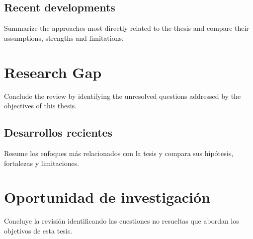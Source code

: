 {
  \subsection{Recent developments}

  Summarize the approaches most directly related to the thesis and compare their assumptions, strengths and limitations.

  \section{Research Gap}

  Conclude the review by identifying the unresolved questions addressed by the objectives of this thesis.
}
{
  \subsection{Desarrollos recientes}

  Resume los enfoques más relacionados con la tesis y compara sus hipótesis, fortalezas y limitaciones.

  \section{Oportunidad de investigación}

  Concluye la revisión identificando las cuestiones no resueltas que abordan los objetivos de esta tesis.
}








